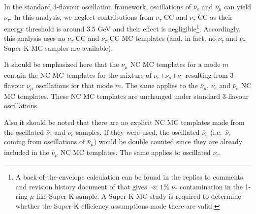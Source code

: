 In the standard 3-flavour oscillation framework, oscillations of $\bar{\nu}_{e}$ and $\bar{\nu}_{\mu}$ can yield $\bar{\nu}_{\tau}$.
In this analysis, we neglect contributions from $\nu_{\tau}$-CC and $\bar{\nu}_{\tau}$-CC as their energy threshold is around 3.5 GeV and their effect is negligible\footnote{A back-of-the-envelope calculation can be found in the replies to comments and revision history document of \cite{OurRun123DisappAnalysis3Flavour} that gives $\ll 1\%$ $\nu_\tau$ contamination in the 1-ring $\mu$-like Super-K sample. A Super-K MC study is required to determine whether the Super-K efficiency assumptions made there are valid.}. Accordingly, this analysis uses no $\nu_{\tau}$-CC and $\bar{\nu}_{\tau}$-CC MC templates (and, in fact, no $\nu_{\tau}$ and $\bar{\nu}_{\tau}$ Super-K MC samples are available).

It should be emphasized here that the $\nu_{\mu}$ NC MC templates for a mode $m$ contain the NC MC templates for the mixture of $\nu_{e}$+$\nu_{\mu}$+$\nu_{\tau}$ resulting from 3-flavour $\nu_{\mu}$ oscillations for that mode $m$. The same applies to the $\bar{\nu}_{\mu}$, $\nu_{e}$ and $\bar{\nu}_{e}$ NC MC templates. These NC MC templates are unchanged under standard 3-flavour oscillations.

Also it should be noted that there are no explicit NC MC templates made from the oscillated $\bar{\nu}_{e}$ and $\nu_{e}$ samples. If they were used, the oscillated $\bar{\nu}_{e}$ (i.e.\ $\bar{\nu}_{e}$ coming from oscillations of $\bar{\nu}_{\mu}$) would be double counted since they are already included in the $\bar{\nu}_{\mu}$ NC MC templates. The same applies to oscillated $\nu_{e}$.

\clearpage
